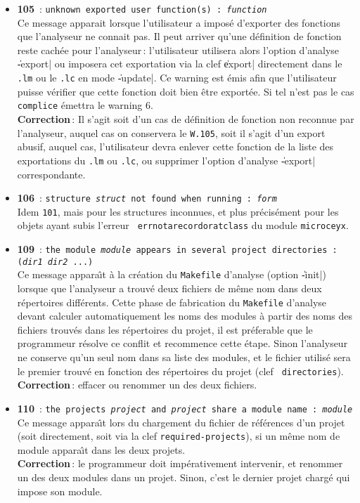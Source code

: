 \begin{itemize}
\item {\Large {\bf 105}}\ : {\tt unknown exported user function(s) : {\em function}}\\
Ce message apparait lorsque l'utilisateur a impos\'{e} d'exporter des
fonctions que l'analyseur ne connait pas. Il peut arriver qu'une
d\'{e}finition de fonction reste cach\'{e}e pour l'analyseur\,:
l'utilisateur utilisera alors l'option d'analyse \|-export| ou
imposera cet exportation via la clef \|export| directement dans le
{\tt .lm} ou le {\tt .lc} en mode \|-update|.
Ce warning est \'{e}mis afin que l'utilisateur puisse v\'{e}rifier que cette
fonction doit bien \^{e}tre export\'{e}e. Si tel n'est pas le cas {\tt
complice} \'{e}mettra le warning 6.\\
{\bf Correction}\,: Il s'agit soit d'un cas de d\'{e}finition de fonction
non reconnue par l'analyseur, auquel cas on conservera le {\tt W.105},
soit il s'agit d'un export abusif, auquel cas, l'utilisateur devra
enlever cette fonction de la liste des exportations du {\tt .lm} ou
{\tt .lc}, ou supprimer l'option d'analyse \|-export| correspondante.

\item {\Large {\bf 106}}\ : {\tt structure {\em struct} not found when
running : {\em form}}\\
Idem {\tt 101}, mais pour les structures inconnues, et plus
pr\'{e}cis\'{e}ment pour les objets ayant subis l'erreur {\tt
errnotarecordoratclass} du module {\tt microceyx}.

\item {\Large {\bf 109}}\ : {\tt the module {\em module} appears in several
project directories : ({\em dir1} {\em dir2} ...)}\\
Ce message appara\^{\i}t \`{a} la cr\'{e}ation du {\tt Makefile} d'analyse (option
\|-init|) lorsque que l'analyseur a trouv\'{e} deux fichiers de m\^{e}me
nom dans deux r\'{e}pertoires diff\'{e}rents. Cette phase de fabrication du
{\tt Makefile} d'analyse devant calculer automatiquement les noms des modules
\`{a} partir des noms des fichiers trouv\'{e}s dans les r\'{e}pertoires du
projet, il est pr\'{e}ferable que le programmeur r\'{e}solve ce conflit et
recommence cette \'{e}tape. Sinon l'analyseur ne conserve qu'un seul nom
dans sa liste des modules, et le fichier utilis\'{e} sera le premier
trouv\'{e} en fonction des r\'{e}pertoires du projet (clef {\tt
directories}). \\
{\bf Correction}\,: effacer ou renommer un des deux fichiers.

\item {\Large {\bf 110}}\ : {\tt the projects {\em project} and {\em project} share
a module name : {\em module}}\\
Ce message appara\^{\i}t lors du chargement du fichier de r\'{e}f\'{e}rences
d'un projet (soit directement, 
soit via la clef {\tt required-projects}), si un m\^{e}me nom de module
appara\^{\i}t dans les deux projets.\\
{\bf Correction}\,: le programmeur doit imp\'{e}rativement intervenir, et
renommer un des deux modules dans un projet. Sinon, c'est le dernier
projet charg\'{e} qui impose son module.


\end{itemize}
